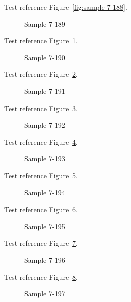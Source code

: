 Test reference Figure~\ref{fig:sample-7-188}.

\begin{figure}[tbhp]
\caption{Sample 7-189}
\label{fig:sample-7-189}
\end{figure}

Test reference Figure~\ref{fig:sample-7-189}.

\begin{figure}[tbhp]
\caption{Sample 7-190}
\label{fig:sample-7-190}
\end{figure}

Test reference Figure~\ref{fig:sample-7-190}.

\begin{figure}[tbhp]
\caption{Sample 7-191}
\label{fig:sample-7-191}
\end{figure}

Test reference Figure~\ref{fig:sample-7-191}.

\begin{figure}[tbhp]
\caption{Sample 7-192}
\label{fig:sample-7-192}
\end{figure}

Test reference Figure~\ref{fig:sample-7-192}.

\begin{figure}[tbhp]
\caption{Sample 7-193}
\label{fig:sample-7-193}
\end{figure}

Test reference Figure~\ref{fig:sample-7-193}.

\begin{figure}[tbhp]
\caption{Sample 7-194}
\label{fig:sample-7-194}
\end{figure}

Test reference Figure~\ref{fig:sample-7-194}.

\begin{figure}[tbhp]
\caption{Sample 7-195}
\label{fig:sample-7-195}
\end{figure}

Test reference Figure~\ref{fig:sample-7-195}.

\begin{figure}[tbhp]
\caption{Sample 7-196}
\label{fig:sample-7-196}
\end{figure}

Test reference Figure~\ref{fig:sample-7-196}.

\begin{figure}[tbhp]
\caption{Sample 7-197}
\label{fig:sample-7-197}
\end{figure}


